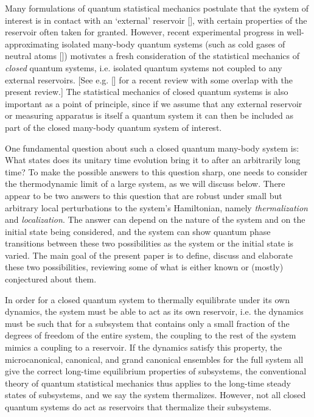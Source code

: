\documentclass[amsmath,onecolumn, superscriptaddress,preprint,aps]{revtex4}
\renewcommand{\cite}[1]{[\onlinecite{#1}]}
\begin{document}
  Many formulations of quantum statistical mechanics postulate that the system of interest is in contact with an `external' reservoir \cite{Kardar},
  with certain properties of the reservoir often taken for granted. %
  However, recent experimental progress in well-approximating isolated many-body quantum systems (such as cold gases of neutral atoms \cite{bloch})
  motivates a fresh consideration of the statistical mechanics of {\it closed} quantum systems, i.e. isolated quantum systems not coupled to any external reservoirs.
  [See e.g. \cite{PolkovnikovRMP} for a recent review with some overlap with the present review.]
  The statistical mechanics of closed quantum systems is also important as a point of principle,
  since if we assume that any external reservoir or measuring apparatus is itself a quantum system it can then be
  included as part of the closed many-body quantum system of interest.

  One fundamental question about such a closed quantum many-body system is: What states does its unitary time evolution bring it to after an arbitrarily long time?  To make the possible answers to this question sharp, one needs to consider the thermodynamic limit of a large system, as we will discuss below.  There appear to be two answers to this question that are robust under small but arbitrary local perturbations to the system's Hamiltonian, namely {\it thermalization} and {\it localization}.  The answer can depend on the nature of the system and on the initial state being considered, and the system can show quantum phase transitions between these two possibilities as the system or the initial state is varied.  The main goal of the present paper is to define, discuss and elaborate these two possibilities, reviewing some of what is either known or (mostly) conjectured about them.

  In order for a closed quantum system to thermally equilibrate under its own dynamics, the system must be able to act as its own reservoir, i.e. the
  dynamics must be such that for a subsystem that contains only a small fraction of the degrees of freedom of the entire system, the coupling to the
  rest of the system mimics a coupling to a reservoir.  If the dynamics satisfy this property, the microcanonical, canonical, and grand canonical
  ensembles for the full system all give the correct long-time equilibrium properties of subsystems, the conventional theory of quantum statistical
  mechanics thus applies to the long-time steady states of subsystems, and we say the system thermalizes.
  However, not all closed quantum systems do act as reservoirs that thermalize their subsystems.
\end{document}
